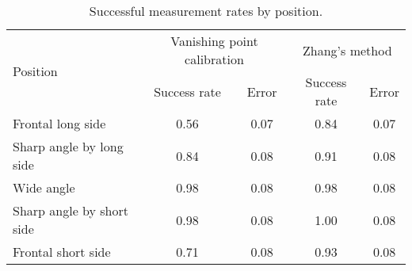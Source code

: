 \begin{table}
\centering
\begin{tabular}{@{} l *4c @{}}
\toprule
\multirow{2}{*}{Position} & \multicolumn{2}{c}{Vanishing point calibration} & \multicolumn{2}{c}{Zhang's method}\\ 
\cmidrule(r){2-3}
\cmidrule(r){4-5}
& Success rate & Error & Success rate & Error \\
\midrule
 Frontal long side 			& 0.56 & 0.07 & 0.84 & 0.07 \\ 
 Sharp angle by long side  	& 0.84 & 0.08 & 0.91 & 0.08 \\
 Wide angle 				& 0.98 & 0.08 & 0.98 & 0.08 \\
 Sharp angle by short side 	& 0.98 & 0.08 & 1.00 & 0.08 \\
 Frontal short side 		& 0.71 & 0.08 & 0.93 & 0.08 \\
\bottomrule
 \end{tabular}
 \caption{Successful measurement rates by position.}
\label{table:key_measurement_by_position}
\end{table}